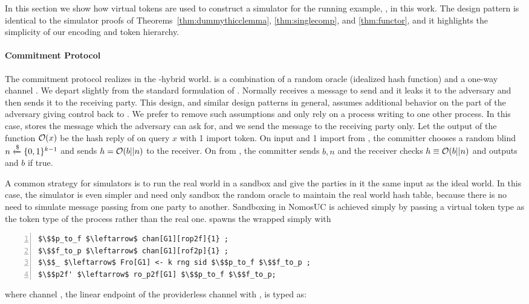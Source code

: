 In this section we show how virtual tokens are used to construct a simulator for the running example, \Fcom, in this work.
The design pattern is identical to the simulator proofs of Theorems~\ref{thm:dummythicclemma}, \ref{thm:singlecomp}, and \ref{thm:functor}, and it highlights the simplicity of our encoding and token hierarchy.

\paragraph*{\textbf{Commitment Protocol}}
The commitment protocol realizes \Fcom in the \Fropp-hybrid world.
\Fropp is a combination of a random oracle \Fro (idealized hash function) and a one-way channel \Fauth.
We depart slightly from the standard formulation of \Fauth. Normally \Fauth receives a message to send and it leaks it to the adversary and then sends it to the receiving party.
This design, and similar design patterns in general, assumes additional behavior on the part of the adversary giving control back to \Fauth. 
We prefer to remove such assumptions and only rely on a process writing to one other process. In this case, \Fauth stores the message which the adversary can 
ask for, and we send the message to the receiving party only.
Let the output of the function $\mathcal{O}(x)$ be the hash reply of \Fropp on query $x$ with 1 import token.
On input  and 1 import from \Z, the committer chooses a random blind $n \xleftarrow{\$} \{0,1\}^{k-1}$ and sends $h = \mathcal{O}(b || n)$ to the receiver. 
On  from \Z, the committer sends $b,n$ and the receiver checks $h \equiv \mathcal{O}(b || n)$ and outputs  and $b$ if true. 

A common strategy for simulators is to run the real world in a sandbox and give the parties in it the same input as the ideal world. 
In this case, the simulator \simcom is even simpler and need only sandbox the random oracle \Fro to maintain the real world hash table, because there is no need to simulate message passing from one party to another. 
Sandboxing in NomosUC is achieved simply by passing a virtual token type as the token type of the process rather than the real one. 
\simcom spawns the wrapped \Fro simply with
\begin{lstlisting}[basicstyle=\footnotesize\BeraMonottFamily, mathescape, frame=single, numbers=left, xleftmargin=2em, xrightmargin=2em]
$\$$p_to_f $\leftarrow$ chan[G1][rop2f]{1} ;
$\$$f_to_p $\leftarrow$ chan[G1][rof2p]{1} ;
$\$$_ $\leftarrow$ Fro[G1] <- k rng sid $\$$p_to_f $\$$f_to_p ;
$\$$p2f' $\leftarrow$ ro_p2f[G1] $\$$p_to_f $\$$f_to_p;
\end{lstlisting}
where channel , the linear endpoint of the providerless channel with \Fro, is typed as:

